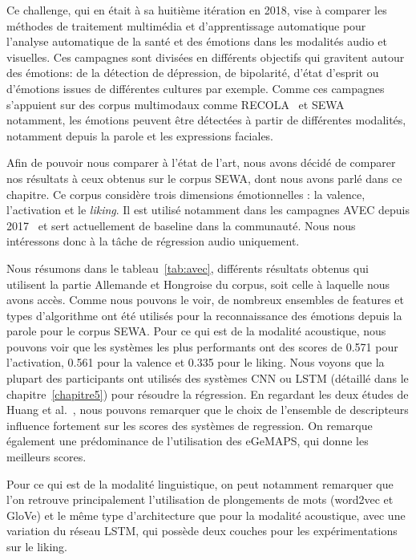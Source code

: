 Ce challenge, qui en était à sa huitième itération en 2018, vise à comparer les méthodes de traitement multimédia et d'apprentissage automatique pour l'analyse automatique de la santé et des émotions dans les modalités audio et visuelles. Ces campagnes sont divisées en différents objectifs qui gravitent autour des émotions: de la détection de dépression, de bipolarité, d'état d'esprit ou d'émotions issues de différentes cultures par exemple. Comme ces campagnes s'appuient sur des corpus multimodaux comme RECOLA~\cite{Ringeval2013} et SEWA~\cite{SEWA} notamment, les émotions peuvent être détectées à partir de différentes modalités, notamment depuis la parole et les expressions faciales.

Afin de pouvoir nous comparer à l'état de l'art, nous avons décidé de comparer nos résultats à ceux obtenus sur le corpus SEWA, dont nous avons parlé dans ce chapitre.
Ce corpus considère trois dimensions émotionnelles : la valence, l'activation et le \textit{liking}. Il est utilisé notamment dans les campagnes AVEC depuis 2017~\cite{AVEC2017,AVEC2018,AVEC2019} et sert actuellement de baseline dans la communauté. Nous nous intéressons donc à la tâche de régression audio uniquement.

Nous résumons dans le tableau~\ref{tab:avec}, différents résultats obtenus qui utilisent la partie Allemande et Hongroise du corpus, soit celle à laquelle nous avons accès. Comme nous pouvons le voir, de nombreux ensembles de features et types d'algorithme ont été utilisés pour la reconnaissance des émotions depuis la parole pour le corpus SEWA.
Pour ce qui est de la modalité acoustique, nous pouvons voir que les systèmes les plus performants ont des scores de 0.571 pour l'activation, 0.561 pour la valence et 0.335 pour le liking. Nous voyons que la plupart des participants ont utilisés des systèmes CNN ou LSTM (détaillé dans le chapitre~\ref{chapitre5}) pour résoudre la régression. En regardant les deux études de Huang et al.~\cite{Huang2017,Huang2018}, nous pouvons remarquer que le choix de l'ensemble de descripteurs influence fortement sur les scores des systèmes de regression. On remarque également une prédominance de l'utilisation des eGeMAPS, qui donne les meilleurs scores.

Pour ce qui est de la modalité linguistique, on peut notamment remarquer que l'on retrouve principalement l'utilisation de plongements de mots (word2vec et GloVe) et le même type d'architecture que pour la modalité acoustique, avec une variation du réseau LSTM, qui possède deux couches pour les expérimentations sur le liking.


